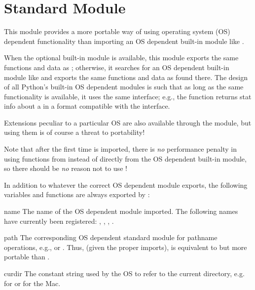 \section{Standard Module }
\label{module-os}

This module provides a more portable way of using operating system
(OS) dependent functionality than importing an OS dependent built-in
module like .

When the optional built-in module  is available, this
module exports the same functions and data as ; otherwise,
it searches for an OS dependent built-in module like  and
exports the same functions and data as found there.  The design of all
Python's built-in OS dependent modules is such that as long as the same
functionality is available, it uses the same interface; e.g., the
function  returns stat info about a  in a
format compatible with the \POSIX{} interface.

Extensions peculiar to a particular OS are also available through the
 module, but using them is of course a threat to portability!

Note that after the first time  is imported, there is \emph{no}
performance penalty in using functions from  instead of
directly from the OS dependent built-in module, so there should be
\emph{no} reason not to use !

In addition to whatever the correct OS dependent module exports, the
following variables and functions are always exported by :


\begin{datadesc}{name}
The name of the OS dependent module imported.  The following names
have currently been registered: , ,
, .
\end{datadesc}

\begin{datadesc}{path}
The corresponding OS dependent standard module for pathname
operations, e.g.,  or .  Thus, (given
the proper imports),  is equivalent to but
more portable than .
\end{datadesc}

\begin{datadesc}{curdir}
The constant string used by the OS to refer to the current directory,
e.g.  for \POSIX{} or  for the Mac.
\end{datadesc}

